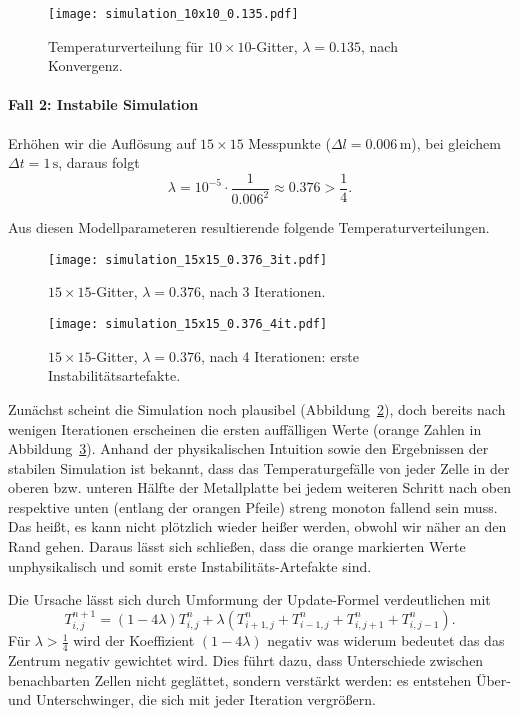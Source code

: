 \begin{figure}[htbp]
	\centering
	\texttt{[image: simulation\_10x10\_0.135.pdf]}
	\caption{Temperaturverteilung für \(10\times 10\)-Gitter, \(\lambda = 0.135\), nach Konvergenz.}
	\label{parallelisierung:fig:simulation_10x10_0.135}
\end{figure}

\paragraph{Fall 2: Instabile Simulation}  
Erhöhen wir die Auflösung auf \(15\times 15\) Messpunkte (\(\Delta l = 0.006\,\mathrm{m}\)), bei gleichem \(\Delta t = 1\,\mathrm{s}\), daraus folgt
\[
\lambda =
10^{-5} \cdot \frac{1}{0.006^2}
\approx 0.376 > \frac14.
\]

Aus diesen Modellparameteren resultierende folgende Temperaturverteilungen.

\begin{figure}[htbp]
	\centering
	\texttt{[image: simulation\_15x15\_0.376\_3it.pdf]}
	\caption{\(15\times 15\)-Gitter, \(\lambda = 0.376\), nach 3 Iterationen.}
	\label{parallelisierung:fig:simulation_15x15_0.376_3it}
\end{figure}

\begin{figure}[htbp]
	\centering
	\texttt{[image: simulation\_15x15\_0.376\_4it.pdf]}
	\caption{\(15\times 15\)-Gitter, \(\lambda = 0.376\), nach 4 Iterationen: erste Instabilitätsartefakte.}
	\label{parallelisierung:fig:simulation_15x15_0.376_4it}
\end{figure}

Zunächst scheint die Simulation noch plausibel (Abbildung~\ref{parallelisierung:fig:simulation_15x15_0.376_3it}), doch bereits nach wenigen Iterationen erscheinen die ersten auffälligen Werte (orange Zahlen in Abbildung~\ref{parallelisierung:fig:simulation_15x15_0.376_4it}). Anhand der physikalischen Intuition sowie den Ergebnissen der stabilen Simulation ist bekannt, dass das Temperaturgefälle von jeder Zelle in der oberen bzw. unteren Hälfte der Metallplatte bei jedem weiteren Schritt nach oben respektive unten (entlang der orangen Pfeile) streng monoton fallend sein muss. Das heißt, es kann nicht plötzlich wieder heißer werden, obwohl wir näher an den Rand gehen. Daraus lässt sich schließen, dass die orange markierten Werte unphysikalisch und somit erste Instabilitäts-Artefakte sind.


Die Ursache lässt sich durch Umformung der Update-Formel verdeutlichen mit
\begin{equation}
	T_{i,j}^{n+1}
	=
	(1-4\lambda)T_{i,j}^n +
	\lambda \left(
	T_{i+1,j}^n + T_{i-1,j}^n + T_{i,j+1}^n + T_{i,j-1}^n
	\right).
\end{equation}
Für \(\lambda > \tfrac14\) wird der Koeffizient \((1-4\lambda)\) negativ was widerum bedeutet das das Zentrum negativ gewichtet wird.  
Dies führt dazu, dass Unterschiede zwischen benachbarten Zellen nicht geglättet, sondern verstärkt werden: es entstehen Über- und Unterschwinger, die sich mit jeder Iteration vergrößern.

